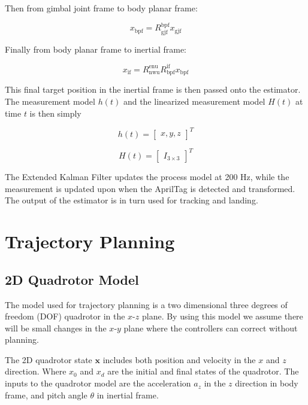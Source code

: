 \documentclass[letterpaper, 10 pt, conference]{ieeeconf}
\begin{document}
Then from gimbal joint frame to body planar frame:

\begin{equation}
  x_{\text{bpf}} = R^{\text{bpf}}_{\text{gjf}} x_{\text{gjf}}
\end{equation}

Finally from body planar frame to inertial frame:

\begin{equation}
  x_{\text{if}} = R^{\text{enu}}_{\text{nwu}}
    R^{\text{if}}_{\text{bpf}}
    x_{\text{bpf}}
\end{equation}

This final target position in the inertial frame is then passed onto the
estimator. The measurement model $h(t)$ and the linearized measurement
model $H(t)$ at time $t$ is then simply

\begin{equation}
    h(t) = \begin{bmatrix} x, y, z \end{bmatrix}^{T}
\end{equation}

\begin{equation}
    H(t) = \begin{bmatrix} I_{3 \times 3} \end{bmatrix}^{T}
\end{equation}

The Extended Kalman Filter updates the process model at 200 Hz, while the
measurement is updated upon when the AprilTag is detected and transformed.
The output of the estimator is in turn used for tracking and landing.


\section{Trajectory Planning}

\subsection{2D Quadrotor Model}
The model used for trajectory planning is a two dimensional three degrees
of freedom (DOF) quadrotor in the $x$-$z$ plane. By using this model we
assume there will be small changes in the $x$-$y$ plane where the
controllers can correct without planning.

The 2D quadrotor state $\textbf{x}$ includes both position and velocity in the
$x$ and $z$ direction. Where $x_{0}$ and $x_{d}$ are the initial and final
states of the quadrotor. The inputs to the quadrotor model are the
acceleration $a_{z}$ in the $z$ direction in body frame, and pitch angle
$\theta$ in inertial frame.
\end{document}
